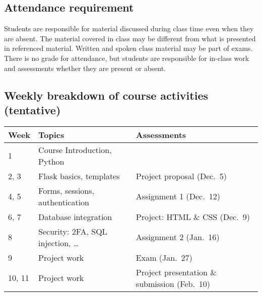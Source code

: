 \documentclass[
  10pt,
]{article}
\begin{document}
\hypertarget{attendance-requirement}{%
\subsection*{Attendance requirement}\label{attendance-requirement}}

Students are responsible for material discussed during class time even
when they are absent. The material covered in class may be different
from what is presented in referenced material. Written and spoken class
material may be part of exams. There is no grade for attendance, but
students are responsible for in-class work and assessments whether they
are present or absent.

\hypertarget{weekly-breakdown-of-course-activities-tentative}{%
\subsection*{Weekly breakdown of course activities
(tentative)}\label{weekly-breakdown-of-course-activities-tentative}}

\begin{longtable}[]{@{}lll@{}}
\toprule
Week & Topics & Assessments\tabularnewline
\midrule
\endhead
1 & Course Introduction, Python &\tabularnewline
2, 3 & Flask basics, templates & Project proposal
(Dec.~5)\tabularnewline
4, 5 & Forms, sessions, authentication & Assignment 1
(Dec.~12)\tabularnewline
6, 7 & Database integration & Project: HTML \& CSS
(Dec.~9)\tabularnewline
8 & Security: 2FA, SQL injection, \ldots{} & Assignment 2
(Jan.~16)\tabularnewline
9 & Project work & Exam (Jan.~27)\tabularnewline
10, 11 & Project work & Project presentation \& submission
(Feb.~10)\tabularnewline
\bottomrule
\end{longtable}
\end{document}
